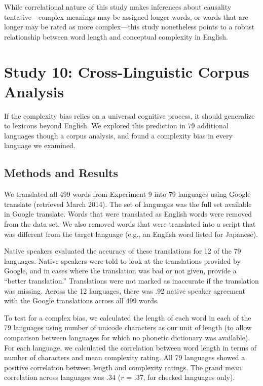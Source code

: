 \documentclass[man]{apa2}
\begin{document}
While correlational nature of this study makes inferences about causality tentative---complex meanings may be assigned longer words, or words that are longer may be rated as more complex---this study nonetheless points to a robust relationship between word length and conceptual complexity in English.

\section{Study 10: Cross-Linguistic Corpus Analysis}

If the complexity bias relies on a universal cognitive process, it should generalize to lexicons beyond English. We explored this prediction in 79 additional languages though a corpus analysis, and found a complexity bias in every language we examined. 

\subsection{Methods and Results}
We translated all 499 words from Experiment 9 into 79 languages using Google translate (retrieved March 2014). The set of languages was the full set available in Google translate. Words that were translated as English words were removed from the data set. We also removed words that were translated into a script that was different from the target language (e.g., an English word listed for Japanese).

Native speakers evaluated the accuracy of these translations for 12 of the 79 languages. Native speakers were told to look at the translations provided by Google, and in cases where the translation was bad or not given, provide a ``better translation.'' Translations were not marked as inaccurate if the translation was missing. Across the 12 languages, there was .92 native speaker agreement with the Google translations across all 499 words. 

To test for a complex bias, we calculated the length of each word in each of the 79 languages using number of unicode characters as our unit of length (to allow comparison between languages for which no phonetic dictionary was available). For each language, we calculated the correlation between word length in terms of number of characters and mean complexity rating. All 79 languages showed a positive correlation between length and complexity ratings. The grand mean correlation across languages was .34 ($r$ = .37, for checked languages only). 
\end{document}
